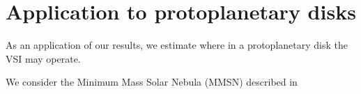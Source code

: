 \section{Application to protoplanetary disks}
As an application of our results, we estimate where in a 
protoplanetary disk the VSI may operate.  




We consider 
the Minimum Mass Solar Nebula (MMSN) described in \cite{chiang10}

